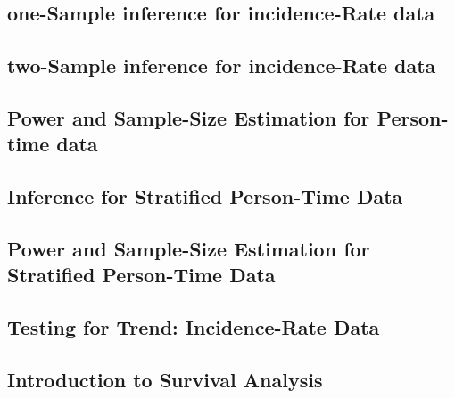 \documentclass[12pt,]{article}
\begin{document}
\hypertarget{one-sample-inference-for-incidence-rate-data}{%
\subsection{one-Sample inference for incidence-Rate
data}\label{one-sample-inference-for-incidence-rate-data}}

\hypertarget{two-sample-inference-for-incidence-rate-data}{%
\subsection{two-Sample inference for incidence-Rate
data}\label{two-sample-inference-for-incidence-rate-data}}

\hypertarget{power-and-sample-size-estimation-for-person-time-data}{%
\subsection{Power and Sample-Size Estimation for Person-time
data}\label{power-and-sample-size-estimation-for-person-time-data}}

\hypertarget{inference-for-stratified-person-time-data}{%
\subsection{Inference for Stratified Person-Time
Data}\label{inference-for-stratified-person-time-data}}

\hypertarget{power-and-sample-size-estimation-for-stratified-person-time-data}{%
\subsection{Power and Sample-Size Estimation for Stratified Person-Time
Data}\label{power-and-sample-size-estimation-for-stratified-person-time-data}}

\hypertarget{testing-for-trend-incidence-rate-data}{%
\subsection{Testing for Trend: Incidence-Rate
Data}\label{testing-for-trend-incidence-rate-data}}

\hypertarget{introduction-to-survival-analysis}{%
\subsection{Introduction to Survival
Analysis}\label{introduction-to-survival-analysis}}
\end{document}
